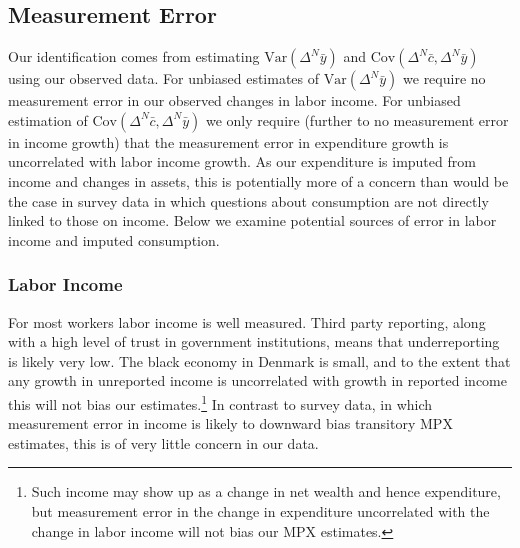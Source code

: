 \documentclass[titlepage]{\econtex}\newcommand{\texname}{ConsumptionHeterogeneity}
\begin{document}
\subsection{Measurement Error} \label{Measurement_error}
Our identification comes from estimating $\mathrm{Var}(\Delta^N \bar{y})$ and $\mathrm{Cov}(\Delta^N \bar{c},\Delta^N \bar{y})$ using our observed data. For unbiased estimates of $\mathrm{Var}(\Delta^N \bar{y})$ we require no measurement error in our observed changes in labor income. For unbiased estimation of $\mathrm{Cov}(\Delta^N \bar{c},\Delta^N \bar{y})$ we only require (further to no measurement error in income growth) that the measurement error in expenditure growth is uncorrelated with labor income growth. As our expenditure is imputed from income and changes in assets, this is potentially more of a concern than would be the case in survey data in which questions about consumption are not directly linked to those on income. Below we examine potential sources of error in labor income and imputed consumption.

\subsubsection{Labor Income}
For most workers labor income is well measured. Third party reporting, along with a high level of trust in government institutions, means that underreporting is likely very low. The black economy in Denmark is small, and to the extent that any growth in unreported income is uncorrelated with growth in reported income this will not bias our estimates.\footnote{Such income may show up as a change in net wealth and hence expenditure, but measurement error in the change in expenditure uncorrelated with the change in labor income will not bias our MPX estimates.} In contrast to survey data, in which measurement error in income is likely to downward bias transitory MPX estimates, this is of very little concern in our data.
\end{document}

